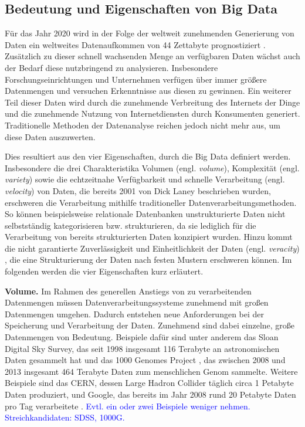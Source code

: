 \subsection{Bedeutung und Eigenschaften von Big Data}
\label{sec:BigData}
Für das Jahr 2020 wird in der Folge der weltweit zunehmenden Generierung von Daten ein weltweites Datenaufkommen von 44 Zettabyte prognostiziert \cite{EMC2014}. Zusätzlich zu dieser schnell wachsenden Menge an verfügbaren Daten wächst auch der Bedarf diese nutzbringend zu analysieren. Insbesondere Forschungseinrichtungen und Unternehmen verfügen über immer größere Datenmengen und versuchen Erkenntnisse aus diesen zu gewinnen. Ein weiterer Teil dieser Daten wird durch die zunehmende Verbreitung des Internets der Dinge und die zunehmende Nutzung von Internetdiensten durch Konsumenten generiert. Traditionelle Methoden der Datenanalyse reichen jedoch nicht mehr aus, um diese Daten auszuwerten. 

Dies resultiert aus den vier Eigenschaften, durch die Big Data definiert werden. Insbesondere die drei Charakteristika Volumen (engl. \textit{volume}), Komplexität (engl. \textit{variety}) sowie die echtzeitnahe Verfügbarkeit und schnelle Verarbeitung (engl. \textit{velocity}) von Daten, die bereits 2001 von Dick Laney \cite{Laney2001} beschrieben wurden, erschweren die Verarbeitung mithilfe traditioneller Datenverarbeitungsmethoden. So können beispielsweise relationale Datenbanken unstrukturierte Daten nicht selbstständig kategorisieren bzw. strukturieren, da sie lediglich für die Verarbeitung von bereits strukturierten Daten konzipiert wurden. Hinzu kommt die nicht garantierte Zuverlässigkeit und Einheitlichkeit der Daten (engl. \textit{veracity}) \cite{Zikopoulos2012}, die eine Strukturierung der Daten nach festen Mustern erschweren können. Im folgenden werden die vier Eigenschaften kurz erläutert.

\textbf{Volume.} Im Rahmen des generellen Anstiegs von zu verarbeitenden Datenmengen müssen Datenverarbeitungssysteme zunehmend mit großen Datenmengen umgehen. Dadurch entstehen neue Anforderungen bei der Speicherung und Verarbeitung der Daten. 
Zunehmend sind dabei einzelne, große Datenmengen von Bedeutung. Beispiele dafür sind unter anderem das Sloan Digital Sky Survey, das seit 1998 insgesamt 116 Terabyte an astronomischen Daten gesammelt hat \cite{York2000, Alam2015} und das 1000 Genomes Project \cite{Baker2010}, das zwischen 2008 und 2013 insgesamt 464 Terabyte Daten zum menschlichen Genom sammelte. Weitere Beispiele sind das CERN, dessen Large Hadron Collider täglich circa 1 Petabyte Daten produziert, und Google, das bereits im Jahr 2008 rund 20 Petabyte Daten pro Tag verarbeitete \cite{Dean2008}. \textcolor{blue}{Evtl. ein oder zwei Beispiele weniger nehmen. Streichkandidaten: SDSS, 1000G.} 

